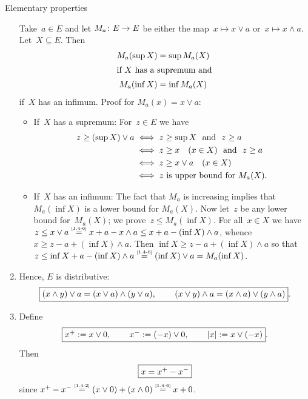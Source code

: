 \documentclass[main.tex]{subfiles}
\begin{document}
\begin{psec}{1.4}{Elementary properties}
\begin{enumerate}
\label{1.4-7}
Take~$a\in E$ and let $M_a\colon E\rightarrow E$ 
be either the map~$x\mapsto x\vee a$
or~$x\mapsto x\wedge a$. 
Let~$X\subseteq E$.
Then
\begin{align*}
M_a(\sup X) &= \sup M_a(X) \\
\intertext{%
if $X$ has a supremum and}
M_a(\inf X) &= \inf M_a(X)
\end{align*}
if~$X$ has an infimum.
Proof for $M_a(x)=x\vee a$:
\begin{itemize}
\item %
If~$X$ has a supremum:  
For~$z\in E$ we have
\begin{align*}
z\ge (\sup X)\vee a  
  & \iff z\ge \sup X\ \text{ and }\  z\ge a \\
  & \iff z\ge x\quad (x\in X)\ \text{ and }\  z\ge a\\
  & \iff z\ge x\vee a\quad (x\in X) \\
  & \iff z\text{ is upper bound for }M_a(X)\text{.}
\end{align*}
\item %
If~$X$ has an infimum: 
The fact that $M_a$ is increasing 
implies that $M_a(\inf X)$ is a lower bound
for $M_a(X)$.
Now let~$z$
be any lower bound for~$M_a(X)$;
we prove~$z\leq M_a(\inf X)$.
For all~$x\in X$
we have
$z\leq x\vee a 
\isref{1.4-6}
x+a - x\wedge a
\leq x+a-(\inf X)\wedge a$,
whence
$x\ge z-a+(\inf X)\wedge a$.
Then $\inf X\geq z-a+(\inf X)\wedge a$
so that 
$z\leq \inf X +a - (\inf X)\wedge a
\isref{1.4-6}
(\inf X)\vee a = M_a(\inf X)$.
\end{itemize}
\item %
\label{1.4-8}
Hence, $E$ is distributive:
\begin{equation*}
\fbox{$ (x\wedge y)\vee a = (x\vee a)\wedge(y\vee a)
\text{, }\qquad
(x\vee y)\wedge a = (x\wedge a)\vee (y\wedge a) $}
\text{.}
\end{equation*}
\item %
\label{1.4-9}
Define
\begin{equation*}
\frmd{%
x^+ := x\vee 0\htam{, }\qquad
x^- := (-x)\vee 0\htam{, }\qquad
|x| := x\vee(-x)}
\htam{.}
\end{equation*}
Then 
\begin{equation*}
\fbox{$  x = x^+ - x^-  $}
\end{equation*}
since $x^+ - x^-
\isref{1.4-2}(x\vee 0)+(x\wedge 0) 
\isref{1.4-6}x+0$.


\end{enumerate}
\end{psec}
\end{document}

